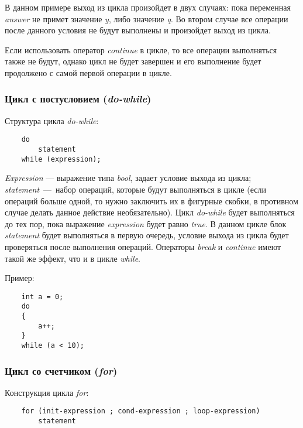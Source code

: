 В данном примере выход из цикла произойдет в двух случаях: пока переменная \textit{answer} не примет значение \textit{y}, либо значение \textit{q}. Во втором случае все операции после данного условия не будут выполнены и произойдет выход из цикла.

Если использовать оператор \textit{continue} в цикле, то все операции выполняться также не будут, однако цикл не будет завершен и его выполнение будет продолжено с самой первой операции в цикле.

\subsubsection{Цикл с постусловием (\textit{do-while})}
Структура цикла \textit{do-while}:
\begin{lstlisting}
    do
        statement
    while (expression);
\end{lstlisting}

\textit{Expression} --- выражение типа \textit{bool}, задает условие выхода из цикла; \textit{statement}~---~набор операций, которые будут выполняться в цикле (если операций больше одной, то нужно заключить их в фигурные скобки, в противном случае делать данное действие необязательно). Цикл \textit{do-while} будет выполняться до тех пор, пока выражение \textit{expression} будет равно \textit{true}. В данном цикле блок \textit{statement} будет выполняться в первую очередь, условие выхода из цикла будет проверяться после выполнения операций. Операторы \textit{break} и \textit{continue} имеют такой же эффект, что и в цикле \textit{while}.

Пример:
\begin{lstlisting}
    int a = 0;
    do
    {
        a++;
    }
    while (a < 10);
\end{lstlisting}

\subsubsection{Цикл со счетчиком (\textit{for})}
Конструкция цикла \textit{for}:
\begin{lstlisting}
    for (init-expression ; cond-expression ; loop-expression)
        statement
\end{lstlisting}

